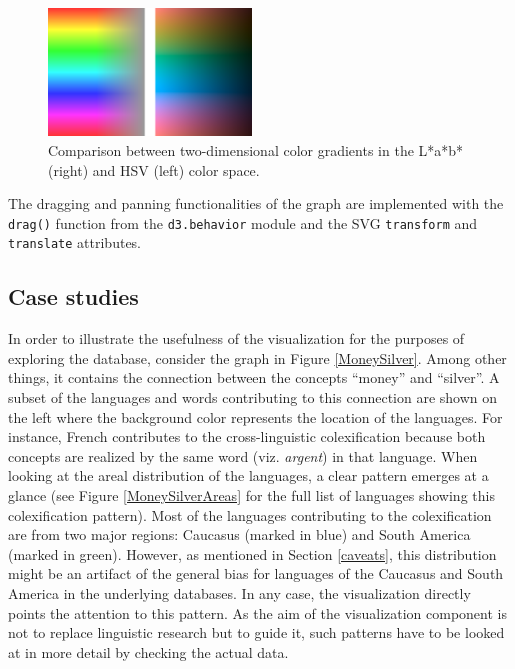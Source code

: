 \begin{figure}[h]
    \centering
   \includegraphics[width=0.48\textwidth]{img/Lab_HSV2.png}
    \caption{Comparison between two-dimensional color gradients in the L*a*b* (right) and HSV (left)
    color space.}
    \label{lab vs hsv}
\end{figure}


The  dragging and panning functionalities of the graph are implemented with the \texttt{drag()} function from the \texttt{d3.behavior} module and the SVG \texttt{transform} and \texttt{translate} attributes. 

\subsection{Case studies} \label{case study}

In order to illustrate the usefulness of the visualization for the purposes of exploring the database, consider the graph in Figure \ref{MoneySilver}. Among other things, it contains the connection between the concepts ``money'' and ``silver''. A subset of the languages and words contributing to this connection are shown on the left where the background color represents the location of the languages. For instance, French contributes to the cross-linguistic colexification because both concepts are realized by the same word (viz. \textit{argent}) in that language. When looking at the areal distribution of the languages, a clear pattern emerges at a glance (see Figure \ref{MoneySilverAreas} for the full list of languages showing this colexification pattern). Most of the languages contributing to the colexification are from two major regions: Caucasus (marked in blue) and South America (marked in green). However, as mentioned in Section \ref{caveats}, this distribution might be an artifact of the general bias for languages of the Caucasus and South America in the underlying databases. In any case, the visualization directly points the attention to this pattern. As the  aim of the visualization component is not to replace linguistic research but to guide it, such patterns have to be looked at in more detail by checking the actual data. 

